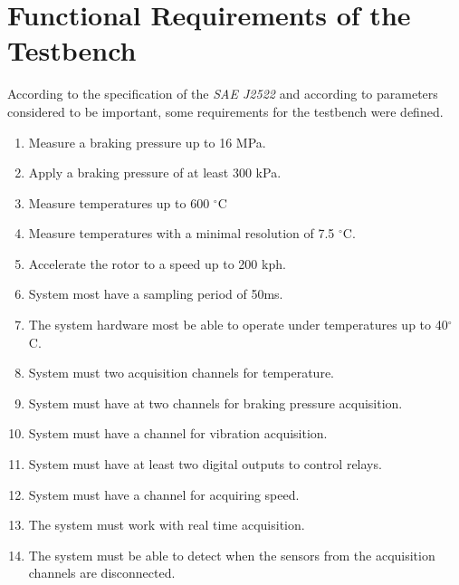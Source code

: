 \section{Functional Requirements of the Testbench}\label{sec:functionalRequirements}

	According to the specification of the \textit{SAE J2522} and according to parameters considered to be important, some requirements for the testbench were defined.

	\begin{enumerate}
		\item Measure a braking pressure up to 16 MPa.\label{itm:func-req-1}
		\item Apply a braking pressure of at least 300 kPa.\label{itm:func-req-2}
		\item Measure temperatures up to 600 $^{\circ}$C\label{itm:func-req-3}
		\item Measure temperatures with a minimal resolution of 7.5 $^{\circ}$C.\label{itm:func-req-4}
		\item Accelerate the rotor to a speed up to 200 kph.\label{itm:func-req-5}
		\item System most have a sampling period of 50ms.\label{itm:func-req-6}
		\item The system hardware most be able to operate under temperatures up to 40$^{\circ}$C.\label{itm:func-req-7}
		\item System must two acquisition channels for temperature.\label{itm:func-req-8}
		\item System must have at two channels for braking pressure acquisition.\label{itm:func-req-9}
		\item System must have a channel for vibration acquisition.\label{itm:func-req-10}
		\item System must have at least two digital outputs to control relays.\label{itm:func-req-11}
		\item System must have a channel for acquiring speed.\label{itm:func-req-12}
		\item The system must work with real time acquisition.\label{itm:func-req-13}
		\item The system must be able to detect when the sensors from the acquisition channels are disconnected.\label{itm:func-req-14}
	\end{enumerate}

